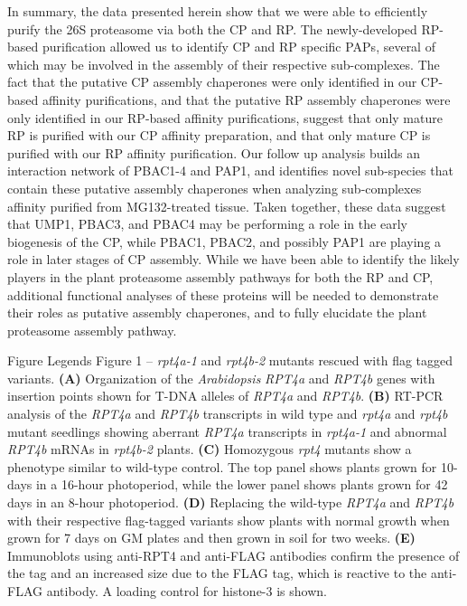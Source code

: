 In summary, the data presented herein show that we were able to efficiently purify the 26S proteasome via both the CP and RP. The newly-developed RP-based purification allowed us to identify CP and RP specific PAPs, several of which may be involved in the assembly of their respective sub-complexes. The fact that the putative CP assembly chaperones were only identified in our CP-based affinity purifications, and that the putative RP assembly chaperones were only identified in our RP-based affinity purifications, suggest that only mature RP is purified with our CP affinity preparation, and that only mature CP is purified with our RP affinity purification. Our follow up analysis builds an interaction network of PBAC1-4 and PAP1, and identifies novel sub-species that contain these putative assembly chaperones when analyzing sub-complexes affinity purified from MG132-treated tissue. Taken together, these data suggest that UMP1, PBAC3, and PBAC4 may be performing a role in the early biogenesis of the CP, while PBAC1, PBAC2, and possibly PAP1 are playing a role in later stages of CP assembly. While we have been able to identify the likely players in the plant proteasome assembly pathways for both the RP and CP, additional functional analyses of these proteins will be needed to demonstrate their roles as putative assembly chaperones, and to fully elucidate the plant proteasome assembly pathway.  

\begin{singlespace}

\renewcommand\bibname{Literature Cited}

\end{singlespace}



Figure Legends
Figure 1 – \textit{rpt4a-1} and \textit{rpt4b-2} mutants rescued with flag tagged variants. \textbf{(A)} Organization of the \textit{Arabidopsis} \textit{RPT4a} and \textit{RPT4b} genes with insertion points shown for T-DNA alleles of \textit{RPT4a} and \textit{RPT4b}. \textbf{(B)} RT-PCR analysis of the \textit{RPT4a} and \textit{RPT4b} transcripts in wild type and \textit{rpt4a} and \textit{rpt4b} mutant seedlings showing aberrant \textit{RPT4a} transcripts in \textit{rpt4a-1} and abnormal \textit{RPT4b} mRNAs in \textit{rpt4b-2} plants. \textbf{(C)} Homozygous \textit{rpt4} mutants show a phenotype similar to wild-type control. The top panel shows plants grown for 10-days in a 16-hour photoperiod, while the lower panel shows plants grown for 42 days in an 8-hour photoperiod. \textbf{(D)} Replacing the wild-type \textit{RPT4a} and \textit{RPT4b} with their respective flag-tagged variants show plants with normal growth when grown for 7 days on GM plates and then grown in soil for two weeks. \textbf{(E)} Immunoblots using anti-RPT4 and anti-FLAG antibodies confirm the presence of the tag and an increased size due to the FLAG tag, which is reactive to the anti-FLAG antibody. A loading control for histone-3 is shown.

